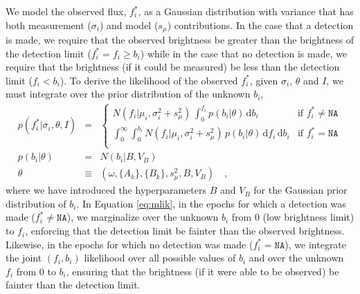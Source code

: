 \documentclass[12pt,preprint]{aastex}
\newcommand{\dd}{\mathrm{d}}
\newcommand{\fobs}{f_i^*}
\begin{document}
We model the observed flux, $\fobs$, as a Gaussian distribution with variance that has both measurement ($\sigma_i$) and model ($s_{\mu}$) contributions.  In the case that a detection is made, we require that the observed brightness be greater than the brightness of the detection limit ($\fobs = f_i \ge b_i$) while in the case that no detection is made, we require that the brightness (if it could be measured) be less than the detection limit ($f_i < b_i$).  To derive the likelihood of the observed $\fobs$, given $\sigma_i$, $\theta$ and $I$, we must integrate over the prior distribution of the unknown $b_i$,
\begin{eqnarray}\displaystyle
p(\fobs |\sigma_i,\theta,I) &=& \left\{\begin{array}{ll}
  N(f_i | \mu_i,  \sigma_i^2 + s_{\mu}^2)\,  \int_0^{f_i} p(b_i | \theta)\, \dd b_i & \mbox{if $\fobs \ne \texttt{NA}$} \\
  \int_{0}^{\infty} \int_{0}^{b_i} N(f_i | \mu_i, \sigma_i^2 + s_{\mu}^2)\, p(b_i | \theta)\, \dd f_i\, \dd b_i & \mbox{if $\fobs = \texttt{NA}$} \\
\end{array}\right.\label{eq:mlik}
\\
p(b_i|\theta) &=& N(b_i|B,V_B)
\label{eq:bprior}
\\
\theta &\equiv& (\omega, \{A_k\}, \{B_k\}, s_\mu^2, B, V_B) \quad ,
\end{eqnarray}
where we have introduced the hyperparameters $B$ and $V_B$ for the Gaussian prior distribution of $b_i$.  In Equation \ref{eq:mlik}, in the epochs for which a detection was made ($\fobs \ne \texttt{NA}$), we marginalize over the unknown $b_i$ from $0$ (low brightness limit) to $f_i$, enforcing that the detection limit be fainter than the observed brightness.  Likewise, in the epochs for which no detection was made ($\fobs = \texttt{NA}$), we integrate the joint $(f_i, b_i)$ likelihood over all possible values of $b_i$ and over the unknown $f_i$ from $0$ to $b_i$, ensuring that the brightness (if it were able to be observed) be fainter than the detection limit.
\end{document}
